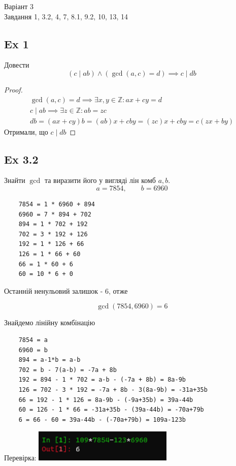 \documentclass[11pt, a4paper]{article} %
\newcommand{\Z}{\mathbb{Z}}
\begin{document}
\begin{mdframed}[backgroundcolor=pink!30]
    Варіант 3\\
    Завдання 1, 3.2, 4, 7, 8.1, 9.2, 10, 13, 14
\end{mdframed}

\subsection*{Ex 1}
\begin{mdframed}
    Довести
    \[(c\mid ab) \land (\gcd(a,c)=d) \implies c \mid db\]
\end{mdframed}

\begin{proof}
    \begin{gather*}
        \gcd(a,c)=d \implies \exists x,y\in\Z: ax + cy = d\\
        c\mid ab \implies \exists z\in\Z: ab = zc\\
        db = (ax+cy)b = (ab)x + cby = (zc)x + cby = c(zx+by)
    \end{gather*}
    Отримали, що $c \mid db$
\end{proof}

\subsection*{Ex 3.2}
\begin{mdframed}
    Знайти $\gcd$ та виразити його у вигляді лін комб $a,b$.
    $$a = 7854, \qquad b = 6960$$
\end{mdframed}
\begin{lstlisting}
    7854 = 1 * 6960 + 894
    6960 = 7 * 894 + 702
    894 = 1 * 702 + 192
    702 = 3 * 192 + 126
    192 = 1 * 126 + 66
    126 = 1 * 66 + 60
    66 = 1 * 60 + 6
    60 = 10 * 6 + 0
\end{lstlisting}
Останній ненульовий залишок - $6$, отже
\begin{mdframed}[style=yellow!20]
    $$\gcd(7854,6960) = 6$$
\end{mdframed}
Знайдемо лінійну комбінацію
\begin{lstlisting}
    7854 = a
    6960 = b
    894 = a-1*b = a-b 
    702 = b - 7(a-b) = -7a + 8b
    192 = 894 - 1 * 702 = a-b - (-7a + 8b) = 8a-9b
    126 = 702 - 3 * 192 = -7a + 8b - 3(8a-9b) = -31a+35b
    66 = 192 - 1 * 126 = 8a-9b - (-9a+35b) = 39a-44b
    60 = 126 - 1 * 66 = -31a+35b - (39a-44b) = -70a+79b
    6 = 66 - 60 = 39a-44b - (-70a+79b) = 109a-123b
\end{lstlisting}
Перевірка:
\includegraphics[width=0.5\textwidth]{gcd1.png}
\end{document}
